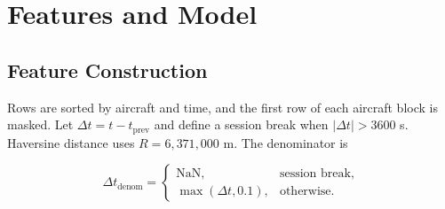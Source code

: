 \documentclass[conference]{IEEEtran}
\begin{document}
\section{Features and Model}

\subsection{Feature Construction}

Rows are sorted by aircraft and time, and the first row of each aircraft block is masked. Let $\Delta t=t-t_{\mathrm{prev}}$ and define a session break when $|\Delta t|>3600$ s. Haversine distance uses $R=6{,}371{,}000$ m. The denominator is

\begin{equation}\Delta t_{\mathrm{denom}}=\begin{cases}\mathrm{NaN},&\text{session break},\\\max(\Delta t,0.1),&\text{otherwise.}\end{cases}\end{equation}
\end{document}
